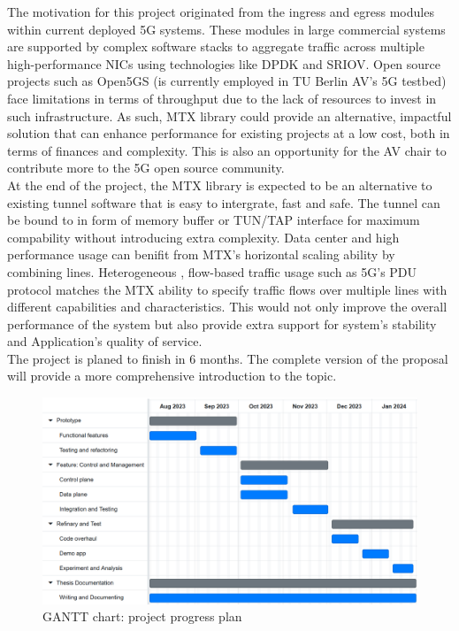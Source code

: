 \documentclass{article} %
\begin{document}
The motivation for this project originated from the ingress and egress modules within current deployed 5G systems. 
These modules in large commercial systems are supported by complex software stacks to aggregate traffic across multiple high-performance NICs using technologies like DPDK and SRIOV.
Open source projects such as Open5GS (is currently employed in TU Berlin AV's 5G testbed) face limitations in terms of throughput due to the lack of resources to invest in such infrastructure.
As such, MTX library could provide an alternative, impactful solution that can enhance performance for existing projects at a low cost, both in terms of finances and complexity. 
This is also an opportunity for the AV chair to contribute more to the 5G open source community.
\\

At the end of the project, the MTX library is expected to be an alternative to existing tunnel software that is easy to intergrate, fast and safe.
The tunnel can be bound to in form of memory buffer or TUN/TAP interface for maximum compability without introducing extra complexity.
Data center and high performance usage can benifit from MTX's horizontal scaling ability by combining lines.
Heterogeneous , flow-based traffic usage such as 5G's PDU protocol matches the MTX ability to specify traffic flows over multiple lines with different capabilities and characteristics.
This would not only improve the overall performance of the system but also provide extra support for system's stability and Application's quality of service.
\\


The project is planed to finish in 6 months.
The complete version of the proposal will provide a more comprehensive introduction to the topic.

\begin{figure}
	\centering
	\includegraphics[width=1.0\textwidth]{resources/images/mini_gannt.PNG}
	\caption{GANTT chart: project progress plan}
\end{figure}
\end{document}
